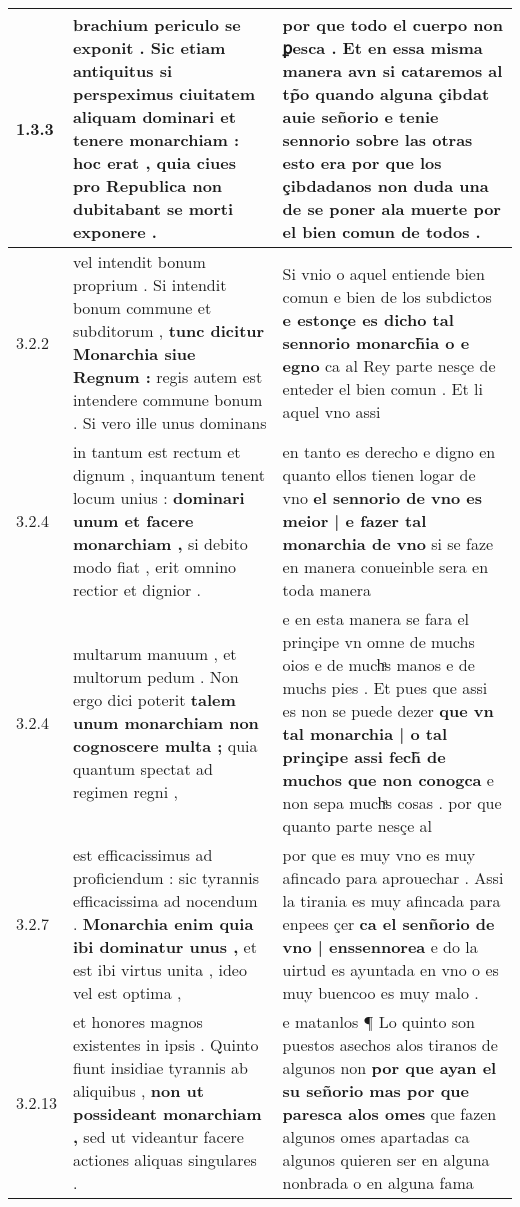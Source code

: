 \begin{tabular}{|p{1cm}|p{6.5cm}|p{6.5cm}|}

\hline
1.3.3 & brachium periculo se exponit . Sic etiam antiquitus \textbf{ si perspeximus ciuitatem aliquam dominari et tenere monarchiam : } hoc erat , quia ciues pro Republica non dubitabant se morti exponere . & por que todo el cuerpo non ꝑesca . Et en essa misma manera avn si cataremos al tp̃o \textbf{ quando alguna çibdat auie señorio e tenie sennorio sobre las otras esto era } por que los çibdadanos non duda una de se poner ala muerte por el bien comun de todos . \\\hline
3.2.2 & vel intendit bonum proprium . Si intendit bonum commune et subditorum , \textbf{ tunc dicitur Monarchia siue Regnum : } regis autem est intendere commune bonum . Si vero ille unus dominans & Si vnio o aquel entiende bien comun e bien de los subdictos \textbf{ e estonçe es dicho tal sennorio monarch̃ia o e egno } ca al Rey parte nesçe de enteder el bien comun . Et li aquel vno assi \\\hline
3.2.4 & in tantum est rectum et dignum , inquantum tenent locum unius : \textbf{ dominari unum et facere monarchiam , } si debito modo fiat , erit omnino rectior et dignior . & en tanto es derecho e digno en quanto ellos tienen logar de vno \textbf{ el sennorio de vno es meior | e fazer tal monarchia de vno } si se faze en manera conueinble sera en toda manera \\\hline
3.2.4 & multarum manuum , et multorum pedum . Non ergo dici poterit \textbf{ talem unum monarchiam non cognoscere multa ; } quia quantum spectat ad regimen regni , & e en esta manera se fara el prinçipe vn omne de muchs oios e de muchͣs manos e de muchs pies . Et pues que assi es non se puede dezer \textbf{ que vn tal monarchia | o tal prinçipe assi fech̃ de muchos que non conogca } e non sepa muchͣs cosas . por que quanto parte nesçe al \\\hline
3.2.7 & est efficacissimus ad proficiendum : sic tyrannis efficacissima ad nocendum . \textbf{ Monarchia enim quia ibi dominatur unus , } et est ibi virtus unita , ideo vel est optima , & por que es muy vno es muy afincado para aprouechar . Assi la tirania es muy afincada para enpees çer \textbf{ ca el senñorio de vno | enssennorea } e do la uirtud es ayuntada en vno o es muy buencoo es muy malo . \\\hline
3.2.13 & et honores magnos existentes in ipsis . Quinto fiunt insidiae tyrannis ab aliquibus , \textbf{ non ut possideant monarchiam , } sed ut videantur facere actiones aliquas singulares . & e matanlos ¶ Lo quinto son puestos asechos alos tiranos de algunos non \textbf{ por que ayan el su señorio mas por que paresca alos omes } que fazen algunos omes apartadas ca algunos quieren ser en alguna nonbrada o en alguna fama \\\hline

\end{tabular}
